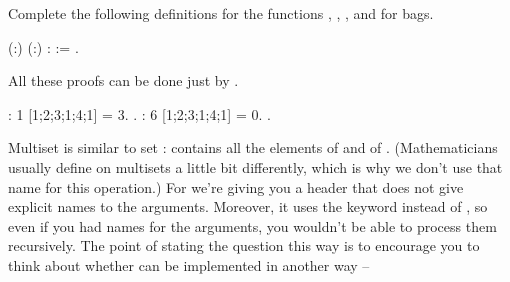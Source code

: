 \documentclass[12pt]{report}
\begin{document}
 Complete the following definitions for the functions
    , , , and  for bags. \begin{coqdoccode}
\coqdocemptyline
\coqdocnoindent
{}  (:) (:) :  := \coqdoceol
\coqdocindent{1.00em}
 .\coqdoceol
\coqdocemptyline
\end{coqdoccode}
All these proofs can be done just by . \begin{coqdoccode}
\coqdocemptyline
\coqdocnoindent
{} :               1 [1;2;3;1;4;1] = 3.\coqdoceol
 .\coqdoceol
\coqdocnoindent
{} :               6 [1;2;3;1;4;1] = 0.\coqdoceol
 .\coqdoceol
\coqdocemptyline
\end{coqdoccode}
Multiset  is similar to set :    contains
    all the elements of  and of .  (Mathematicians usually
    define  on multisets a little bit differently, which
    is why we don't use that name for this operation.)
    For  we're giving you a header that does not give explicit
    names to the arguments.  Moreover, it uses the keyword
     instead of , so even if you had names for
    the arguments, you wouldn't be able to process them recursively.
    The point of stating the question this way is to encourage you to
    think about whether  can be implemented in another way --
\end{document}

